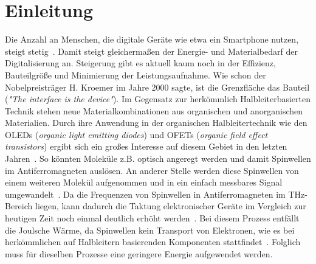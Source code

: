 \chapter{Einleitung}
    Die Anzahl an Menschen, die digitale Geräte wie etwa ein Smartphone nutzen, steigt stetig~\cite{Statista}.
    Damit steigt gleichermaßen der Energie- und Materialbedarf der Digitalisierung an.
    Steigerung gibt es aktuell kaum noch in der Effizienz, Bauteilgröße und Minimierung der Leistungsaufnahme.
    Wie schon der Nobelpreisträger H. Kroemer im Jahre 2000 sagte, ist die Grenzfläche das Bauteil (\textit{"The interface is the device"}).
    Im Gegensatz zur herkömmlich Halbleiterbasierten Technik stehen neue Materialkombinationen aus organischen und anorganischen Materialien.
    Durch ihre Anwendung in der organischen Halbleitertechnik wie den OLEDs (\textit{organic light emitting diodes}) und OFETs (\textit{organic field effect transistors}) ergibt sich ein großes Interesse auf diesem Gebiet in den letzten Jahren~\cite{Uni-Tübingen}.
    So könnten Moleküle z.B. optisch angeregt werden und damit Spinwellen im Antiferromagneten auslösen. 
    An anderer Stelle werden diese Spinwellen von einem weiteren Molekül aufgenommen und in ein einfach messbares Signal umgewandelt~\cite{SINFONIA}.
    Da die Frequenzen von Spinwellen in Antiferromagneten im \si{\tera\hertz}-Bereich liegen, kann dadurch die Taktung elektronischer Geräte im Vergleich zur heutigen Zeit noch einmal deutlich erhöht werden~\cite{AFM_5}.
    Bei diesem Prozess entfällt die Joulsche Wärme, da Spinwellen kein Transport von Elektronen, wie es bei herkömmlichen auf Halbleitern basierenden Komponenten stattfindet~\cite{AFM_3}.
    Folglich muss für dieselben Prozesse eine geringere Energie aufgewendet werden.
   
